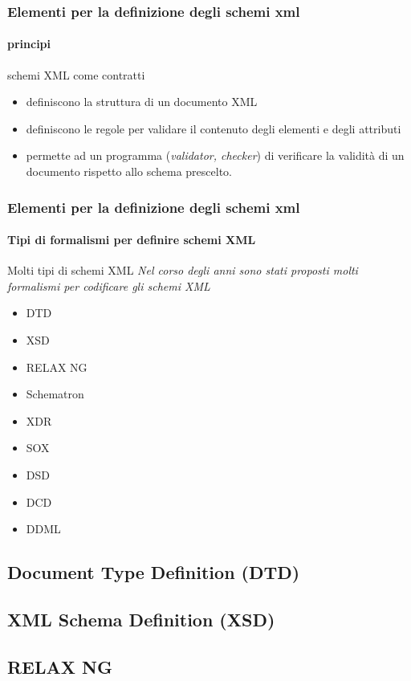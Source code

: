\begin{frame}
    \frametitle{Elementi per la definizione degli schemi xml}
    \framesubtitle{principi}
    \addtocounter{nframe}{1}

    \begin{block}{schemi XML come contratti}
        \begin{itemize}
            \item definiscono la struttura di un documento XML
            \item definiscono le regole per validare il contenuto degli elementi e degli attributi
            \item permette ad un programma (\textit{validator, checker}) di verificare la validità di un documento rispetto allo schema prescelto.
        \end{itemize}
    \end{block}

\end{frame}

\begin{frame}
    \frametitle{Elementi per la definizione degli schemi xml}
    \framesubtitle{Tipi di formalismi per definire schemi XML}
    \addtocounter{nframe}{1}

    \begin{block}{Molti tipi di schemi XML}
        \textit{Nel corso degli anni sono stati proposti molti formalismi per codificare gli schemi XML}
        \begin{itemize}
            \item DTD
            \item XSD 
            \item RELAX NG
            \item Schematron
            \item XDR
            \item SOX 
            \item DSD
            \item DCD
            \item DDML
        \end{itemize}
    \end{block}
  

\end{frame}

\subsection{Document Type Definition (DTD)}


\subsection{XML Schema Definition (XSD)}
%

\subsection{RELAX NG}
%